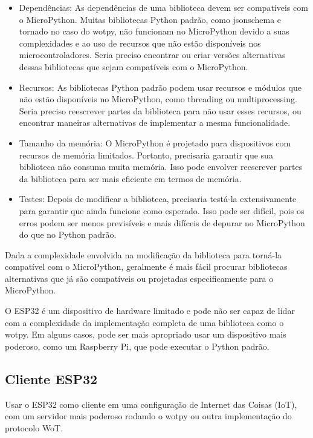 \begin{itemize}
    \item Dependências: As dependências de uma biblioteca devem ser compatíveis com o MicroPython. Muitas bibliotecas Python padrão, como jsonschema e tornado no caso do wotpy, não funcionam no MicroPython devido a suas complexidades e ao uso de recursos que não estão disponíveis nos microcontroladores. Seria preciso encontrar ou criar versões alternativas dessas bibliotecas que sejam compatíveis com o MicroPython.
    \item Recursos: As bibliotecas Python padrão podem usar recursos e módulos que não estão disponíveis no MicroPython, como threading ou multiprocessing. Seria preciso reescrever partes da biblioteca para não usar esses recursos, ou encontrar maneiras alternativas de implementar a mesma funcionalidade.
    \item Tamanho da memória: O MicroPython é projetado para dispositivos com recursos de memória limitados. Portanto, precisaria garantir que sua biblioteca não consuma muita memória. Isso pode envolver reescrever partes da biblioteca para ser mais eficiente em termos de memória.
    \item Testes: Depois de modificar a biblioteca, precisaria testá-la extensivamente para garantir que ainda funcione como esperado. Isso pode ser difícil, pois os erros podem ser menos previsíveis e mais difíceis de depurar no MicroPython do que no Python padrão.
\end{itemize}

Dada a complexidade envolvida na modificação da biblioteca para torná-la compatível com o MicroPython, geralmente é mais fácil procurar bibliotecas alternativas que já são compatíveis ou projetadas especificamente para o MicroPython.

O ESP32 é um dispositivo de hardware limitado e pode não ser capaz de lidar com a complexidade da implementação completa de uma biblioteca como o wotpy. Em alguns casos, pode ser mais apropriado usar um dispositivo mais poderoso, como um Raspberry Pi, que pode executar o Python padrão.

\subsection{Cliente ESP32}

Usar o ESP32 como cliente em uma configuração de Internet das Coisas (IoT), com um servidor mais poderoso rodando o wotpy ou outra implementação do protocolo WoT.

